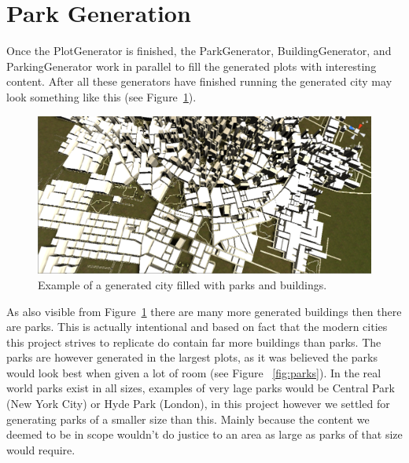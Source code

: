 \section{Park Generation}

Once the PlotGenerator is finished, the ParkGenerator, BuildingGenerator, and ParkingGenerator work in parallel to fill the generated plots with interesting content.
After all these generators have finished running the generated city may look something like this (see Figure~\ref{fig:ex}).
\begin{figure}
\includegraphics[width=\linewidth]{figure/notforcingloops.png}
 \caption{Example of a generated city filled with parks and buildings.}
 \label{fig:ex}
 \end{figure}
As also visible from Figure~\ref{fig:ex} there are many more generated buildings then there are parks. 
This is actually intentional and based on fact that the modern cities this project strives to replicate do contain far more buildings than parks. 
The parks are however generated in the largest plots, as it was believed the parks would look best when given a lot of room (see Figure ~\ref{fig:parks}).
In the real world parks exist in all sizes, examples of very lage parks would be Central Park (New York City) or Hyde Park (London), in this project however we settled for generating parks of a smaller size than this. 
Mainly because the content we deemed to be in scope wouldn't do justice to an area as large as parks of that size would require. 
